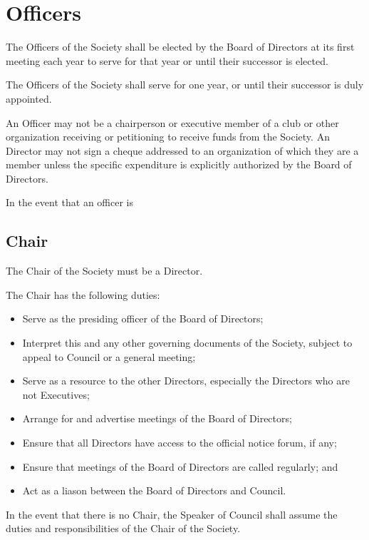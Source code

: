 \section{Officers}
The Officers of the Society shall be elected by the Board of Directors at its 
first meeting each year to serve for that year or until their successor is elected. 

The Officers of the Society shall serve for one year, or until their successor
is duly appointed. 

An Officer may not be a chairperson or executive member of a club or other 
organization receiving or petitioning to receive funds from the Society. 
An Director may not sign a cheque addressed to an organization of which they 
are a member unless the specific expenditure is explicitly authorized by 
the Board of Directors.

In the event that an officer is 
\subsection{Chair}
The Chair of the Society must be a Director.

The Chair has the following duties:
\begin{itemize}
  \item Serve as the presiding officer of the Board of Directors;
  \item Interpret this and any other governing documents of the Society, subject
    to appeal to Council or a general meeting;
    \item Serve as a resource to the other Directors,
    especially the Directors who are not Executives;
  \item Arrange for and advertise meetings of the Board of Directors;
  \item Ensure that all Directors have access to the official notice
    forum, if any;
  \item Ensure that meetings of the Board of Directors are called regularly; and
  \item Act as a liason between the Board of Directors and Council.
\end{itemize}

In the event that there is no Chair, the Speaker of Council shall assume the duties and
responsibilities of the Chair of the Society. 

